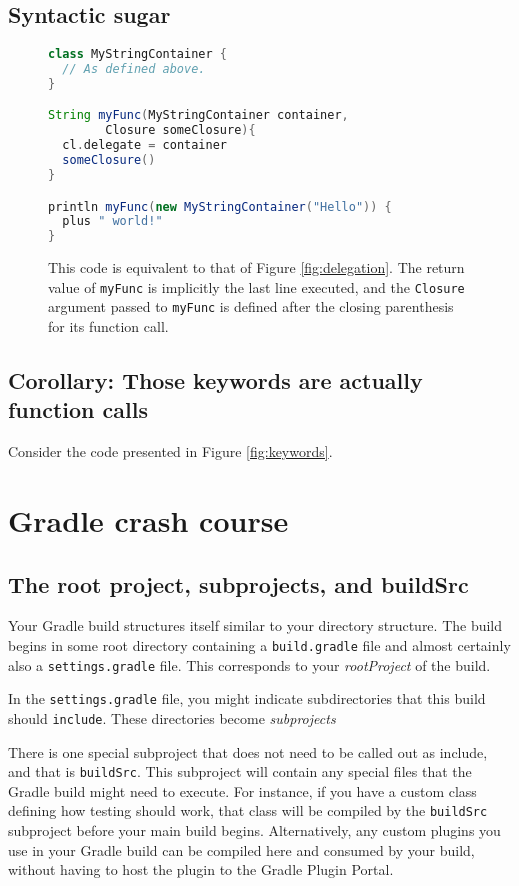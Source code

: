 \documentclass[]{article}
\theoremstyle{definition}
\begin{document}
\subsection{Syntactic sugar}

\begin{figure}[h]
  \centering
  \begin{lstlisting}[language=Groovy]
class MyStringContainer {
  // As defined above.
}

String myFunc(MyStringContainer container,
        Closure someClosure){
  cl.delegate = container
  someClosure()
}

println myFunc(new MyStringContainer("Hello")) {
  plus " world!"
}
  \end{lstlisting}
  \caption{This code is equivalent to that of Figure \ref{fig:delegation}.
    The return value of \texttt{myFunc} is implicitly the last line executed, and the \texttt{Closure} argument passed to \texttt{myFunc} is defined after the closing parenthesis for its function call.
  }
  \label{fig:sugar}
\end{figure}

\subsection{Corollary: Those keywords are actually function calls}

Consider the code presented in Figure \ref{fig:keywords}.


  
\section{Gradle crash course}

\subsection{The root project, subprojects, and buildSrc}

Your Gradle build structures itself similar to your directory structure.
The build begins in some root directory containing a \texttt{build.gradle} file and almost certainly also a \texttt{settings.gradle} file.
This corresponds to your \emph{rootProject} of the build.

In the \texttt{settings.gradle} file, you might indicate subdirectories that this build should \texttt{include}.
These directories become \emph{subprojects}

There is one special subproject that does not need to be called out as include, and that is \texttt{buildSrc}.
This subproject will contain any special files that the Gradle build might need to execute.
For instance, if you have a custom class defining how testing should work, that class will be compiled by the \texttt{buildSrc} subproject before your main build begins.
Alternatively, any custom plugins you use in your Gradle build can be compiled here and consumed by your build, without having to host the plugin to the Gradle Plugin Portal.
\end{document}
